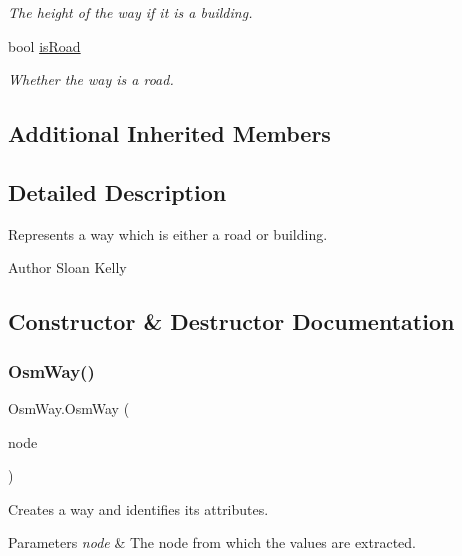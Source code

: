 \begin{DoxyCompactItemize}
\begin{DoxyCompactList}\small\item\em The height of the way if it is a building. \end{DoxyCompactList}\item 
bool \mbox{\hyperlink{class_osm_way_a53b5c420fc8da5a3ae30d3a882d9b168}{is\+Road}}
\begin{DoxyCompactList}\small\item\em Whether the way is a road. \end{DoxyCompactList}\end{DoxyCompactItemize}
\subsection*{Additional Inherited Members}


\subsection{Detailed Description}
Represents a way which is either a road or building. 

\begin{DoxyAuthor}{Author}
Sloan Kelly
\end{DoxyAuthor}


\subsection{Constructor \& Destructor Documentation}
\mbox{\label{class_osm_way_a4b486f3c7606411894045f470aa882c6}} 
\subsubsection{\texorpdfstring{OsmWay()}{OsmWay()}}
{\footnotesize\ttfamily Osm\+Way.\+Osm\+Way (\begin{DoxyParamCaption}\item[{Xml\+Node}]{node }\end{DoxyParamCaption})}



Creates a way and identifies its attributes. 


\begin{DoxyParams}{Parameters}
{\em node} & The node from which the values are extracted.\\
\hline
\end{DoxyParams}


